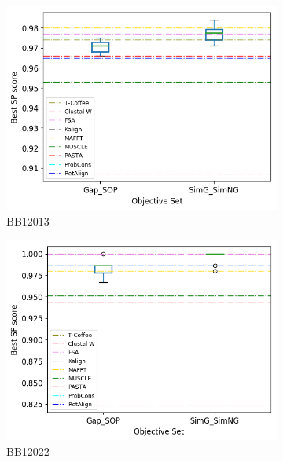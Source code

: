 \begin{figure}[!htbp]
\begin{adjustwidth}{-1cm}{-1cm}
\begin{subfigure}{0.22\textwidth}
			\includegraphics[width=\columnwidth]{Figure/summary/precomputedInit/Balibase/BB12013_objset_pairs_rank_2}
			\caption{BB12013}
		\end{subfigure}
		\begin{subfigure}{0.22\textwidth}
			\includegraphics[width=\columnwidth]{Figure/summary/precomputedInit/Balibase/BB12022_objset_pairs_rank_2}
			\caption{BB12022}
		\end{subfigure}
		\begin{subfigure}{0.22\textwidth}

\end{subfigure}
\end{adjustwidth}
\end{figure}
